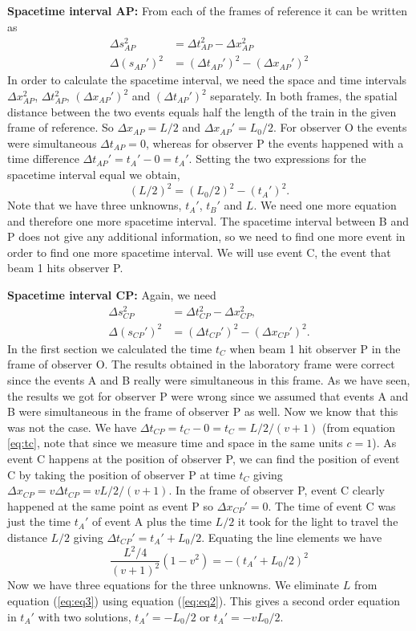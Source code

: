 {\begin{multicols}{2}
{\bf Spacetime interval AP:}
From each of the frames of reference it can be written as
\begin{align*}
\Delta s_{AP}^2&=\Delta t_{AP}^2-\Delta x_{AP}^2\\
\Delta (s_{AP}')^2&=(\Delta t_{AP}')^2-(\Delta x_{AP}')^2
\end{align*}
In order to calculate the spacetime interval, we need the space and time intervals $\Delta x_{AP}^2$, $\Delta t_{AP}^2$, $(\Delta x_{AP}')^2$ and $(\Delta t_{AP}')^2$ separately. In both frames, the spatial distance between the two events equals half the length of the train in the given frame of reference. So $\Delta x_{AP}=L/2$ and $\Delta x_{AP}'=L_0/2$. For observer O the events were simultaneous $\Delta t_{AP}=0$, whereas for observer P the events happened with a time difference $\Delta t_{AP}'=t_A'-0=t_A'$. Setting the two expressions for the spacetime interval equal we obtain,
\begin{equation}
\label{eq:eq2}
(L/2)^2=(L_0/2)^2-(t_A')^2.
\end{equation}
Note that we have three unknowns, $t_A'$, $t_B'$ and $L$. We need one more equation and therefore one more spacetime interval. The spacetime interval between B and P does not give any additional information, so we need to find one more event in order to find one more spacetime interval. We will use event C, the event that beam 1 hits observer P.


{\bf Spacetime interval CP:}
Again, we need
\begin{align*}
\Delta s_{CP}^2&=\Delta t_{CP}^2-\Delta x_{CP}^2,\\
\Delta (s_{CP}')^2&=(\Delta t_{CP}')^2-(\Delta x_{CP}')^2.
\end{align*}
In the first section we calculated the time $t_C$  when beam 1 hit observer P in the frame of observer O. The results obtained in the laboratory frame were correct since the events A and B really were simultaneous in this frame. As we have seen, the results we got for observer P were wrong since we assumed that events A and B were simultaneous in the frame of observer P as well. Now we know that this was not the case. We have $\Delta t_{CP}=t_C-0=t_C=L/2/(v+1)$ (from equation \ref{eq:tc}, note that since we measure time and space in the same units $c=1$). As event C happens at the position of observer P, we can find the position of event C by taking the position of observer P at time $t_C$ giving $\Delta x_{CP}=v\Delta t_{CP}=vL/2/(v+1)$. In the frame of observer P, event C clearly happened at the same point as event P so $\Delta x_{CP}'=0$. The time of event C was just the time $t_A'$ of event A plus the time $L/2$ it took for the light to travel the distance $L/2$ giving $\Delta t_{CP}'=t_A'+L_0/2$. Equating the line elements we have
\begin{equation}
\label{eq:eq3}
\frac{L^2/4}{(v+1)^2}(1-v^2)=-(t_A'+L_0/2)^2
\end{equation}
Now we have three equations for the three unknowns. We eliminate $L$ from equation (\ref{eq:eq3}) using equation (\ref{eq:eq2}). This gives a second order equation in $t_A'$ with two solutions, $t_A'=-L_0/2$ or $t_A'=-vL_0/2$. 


\end{multicols}}
